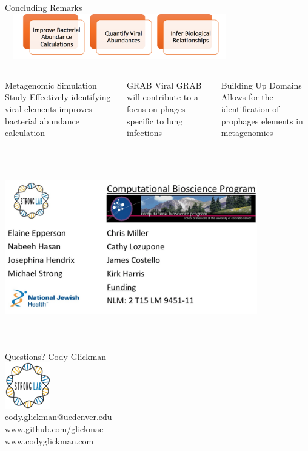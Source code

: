 \documentclass[11pt]{beamer}
\begin{document}
	\begin{frame}{Concluding Remarks}
	\center
	\includegraphics[height=2cm, width=10cm]{goals.png}
	\begin{columns}
	\begin{block}{Metagenomic Simulation Study}
	Effectively identifying viral elements improves bacterial abundance calculation
	\end{block}
	\begin{block}{GRAB}
	Viral GRAB will contribute to a focus on phages specific to lung infections
	\end{block}
	\begin{block}{Building Up Domains}
	Allows for the identification of prophages elements in metagenomics
	\end{block}
	
	\end{columns}
	
	\end{frame}
	
	
	
	
	\begin{frame}{}
	\vspace{1cm}
	{\includegraphics[height=8cm, width=11cm]{Acknowledgements.png} }
	\end{frame}
	
	
	\begin{frame}{Questions?}
	\center
	Cody Glickman \\ \includegraphics[height=2cm, width=2cm]{lablogo.png} \\ cody.glickman@ucdenver.edu \\ \alert{www.github.com/glickmac} \\ www.codyglickman.com
	\end{frame}
	
\end{document}
